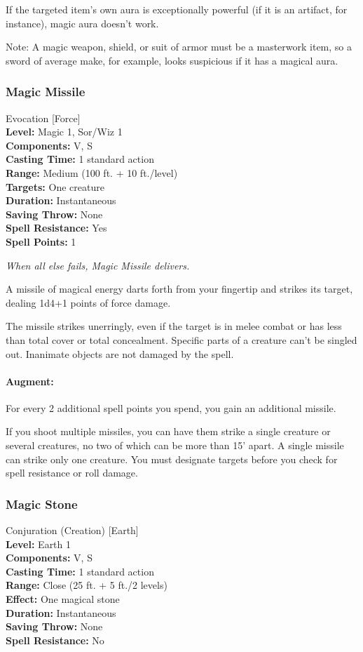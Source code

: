 If the targeted item's own aura is exceptionally powerful (if it is an artifact, for instance), magic aura doesn't work.

Note: A magic weapon, shield, or suit of armor must be a masterwork item, so a sword of average make, for example, looks suspicious if it has a magical aura.
\subsubsection{Magic Missile}
\label{Spell:MagicMissile}
Evocation [Force]
\\ \textbf{Level:} Magic 1, Sor/Wiz 1
\\ \textbf{Components:} V, S
\\ \textbf{Casting Time:} 1 standard action
\\ \textbf{Range:} Medium (100 ft. + 10 ft./level)
\\ \textbf{Targets:} One creature
\\ \textbf{Duration:} Instantaneous
\\ \textbf{Saving Throw:} None
\\ \textbf{Spell Resistance:} Yes
\\ \textbf{Spell Points:} 1

\emph{When all else fails, Magic Missile delivers.}

A missile of magical energy darts forth from your fingertip and strikes its target, dealing 1d4+1 points of force damage.

The missile strikes unerringly, even if the target is in melee combat or has less than total cover or total concealment. 
Specific parts of a creature can't be singled out. Inanimate objects are not damaged by the spell.

\paragraph{Augment:} For every 2 additional spell points you spend, you gain an additional missile.

If you shoot multiple missiles, you can have them strike a single creature or several creatures, no two of which can be more than 15' apart.
A single missile can strike only one creature. You must designate targets before you check for spell resistance or roll damage.
\subsubsection{Magic Stone}
\label{Spell:MagicStone}
Conjuration (Creation) [Earth]
\\ \textbf{Level:} Earth 1
\\ \textbf{Components:} V, S
\\ \textbf{Casting Time:} 1 standard action
\\ \textbf{Range:} Close (25 ft. + 5 ft./2 levels)
\\ \textbf{Effect:} One magical stone
\\ \textbf{Duration:} Instantaneous
\\ \textbf{Saving Throw:} None
\\ \textbf{Spell Resistance:} No

